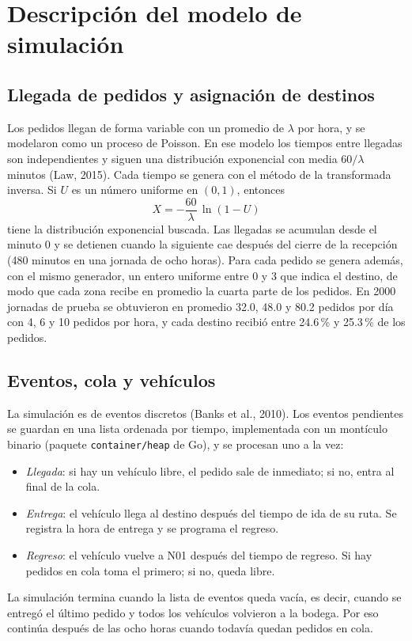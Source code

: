 \documentclass[11pt,letterpaper]{article}
\begin{document}
\section{Descripción del modelo de simulación}

\subsection{Llegada de pedidos y asignación de destinos}

Los pedidos llegan de forma variable con un promedio de $\lambda$ por hora, y se modelaron como un proceso de Poisson. En ese modelo los tiempos entre llegadas son independientes y siguen una distribución exponencial con media $60/\lambda$ minutos (Law, 2015). Cada tiempo se genera con el método de la transformada inversa. Si $U$ es un número uniforme en $(0,1)$, entonces
\begin{equation}
  X = -\frac{60}{\lambda}\,\ln(1-U)
\end{equation}
tiene la distribución exponencial buscada. Las llegadas se acumulan desde el minuto 0 y se detienen cuando la siguiente cae después del cierre de la recepción (480 minutos en una jornada de ocho horas). Para cada pedido se genera además, con el mismo generador, un entero uniforme entre 0 y 3 que indica el destino, de modo que cada zona recibe en promedio la cuarta parte de los pedidos. En 2000 jornadas de prueba se obtuvieron en promedio 32.0, 48.0 y 80.2 pedidos por día con 4, 6 y 10 pedidos por hora, y cada destino recibió entre 24.6\,\% y 25.3\,\% de los pedidos.

\subsection{Eventos, cola y vehículos}

La simulación es de eventos discretos (Banks et al., 2010). Los eventos pendientes se guardan en una lista ordenada por tiempo, implementada con un montículo binario (paquete \texttt{container/heap} de Go), y se procesan uno a la vez:
\begin{itemize}
  \item \textit{Llegada}: si hay un vehículo libre, el pedido sale de inmediato; si no, entra al final de la cola.
  \item \textit{Entrega}: el vehículo llega al destino después del tiempo de ida de su ruta. Se registra la hora de entrega y se programa el regreso.
  \item \textit{Regreso}: el vehículo vuelve a N01 después del tiempo de regreso. Si hay pedidos en cola toma el primero; si no, queda libre.
\end{itemize}
La simulación termina cuando la lista de eventos queda vacía, es decir, cuando se entregó el último pedido y todos los vehículos volvieron a la bodega. Por eso continúa después de las ocho horas cuando todavía quedan pedidos en cola.
\end{document}
